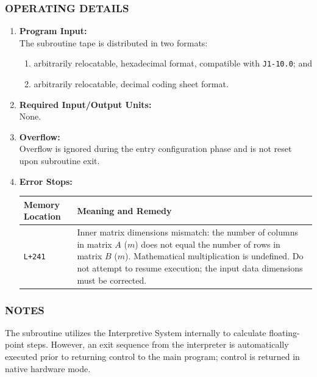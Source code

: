 \documentclass{article}
\begin{document}
\subsubsection*{OPERATING DETAILS}

\begin{enumerate}[leftmargin=1.5em, itemsep=6pt]
    \item \textbf{Program Input:} \\
    The subroutine tape is distributed in two formats:
    \begin{enumerate}[label=\alph*), itemsep=2pt, topsep=2pt]
        \item arbitrarily relocatable, hexadecimal format, compatible with \texttt{J1-10.0}; and
        \item arbitrarily relocatable, decimal coding sheet format.
    \end{enumerate}
    
    \item \textbf{Required Input/Output Units:} \\
    None.
    
    \item \textbf{Overflow:} \\
    Overflow is ignored during the entry configuration phase and is not reset upon subroutine exit.
    
    \item \textbf{Error Stops:} \\
    \begin{tabular}{lp{9cm}}
        \toprule
        \textbf{Memory Location} & \textbf{Meaning and Remedy} \\
        \midrule
        \texttt{L+241}           & Inner matrix dimensions mismatch: the number of columns in matrix $A$ ($m$) does not equal the number of rows in matrix $B$ ($m$). Mathematical multiplication is undefined. Do not attempt to resume execution; the input data dimensions must be corrected. \\
        \bottomrule
    \end{tabular}
\end{enumerate}

\subsubsection*{NOTES}
The subroutine utilizes the Interpretive System internally to calculate floating-point steps. However, an exit sequence from the interpreter is automatically executed prior to returning control to the main program; control is returned in native hardware mode.
\newpage
\end{document}
